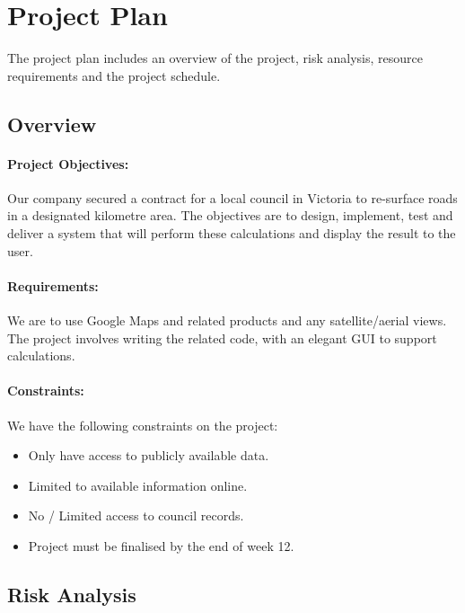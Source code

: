 \documentclass[a4paper,11pt]{article}
\begin{document}
\section{Project Plan}

The project plan includes an overview of the project, risk analysis, resource
requirements and the project schedule.

\subsection{Overview}

\paragraph{Project Objectives:}

Our company secured a contract for a local council in Victoria to re-surface
roads in a designated kilometre area. The objectives are to design, implement,
test and deliver a system that will perform these calculations and display the
result to the user.

\paragraph{Requirements:}

We are to use Google Maps and related products and any satellite/aerial views.
The project involves writing the related code, with an elegant GUI to support
calculations. \autocite[2]{intro:1}

\paragraph{Constraints:}

We have the following constraints on the project:

\begin{itemize}
  \item Only have access to publicly available data.
  \item Limited to available information online.
  \item No / Limited access to council records.
  \item Project must be finalised by the end of week 12.
\end{itemize}

\subsection{Risk Analysis}
\end{document}
